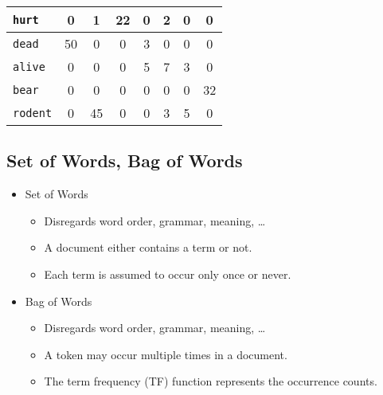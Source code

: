 \begin{table}[H]
\begin{tabular}{|l|c|c|c|c|c|c|c|}
                        \texttt{hurt}   & \textcolor{irl}{0} &         1          &         22         & \textcolor{irl}{0} &         2          & \textcolor{irl}{0} & \textcolor{irl}{0} \\ \hline
                        \texttt{dead}   &         50         & \textcolor{irl}{0} & \textcolor{irl}{0} &         3          & \textcolor{irl}{0} & \textcolor{irl}{0} & \textcolor{irl}{0} \\ \hline
                        \texttt{alive}  & \textcolor{irl}{0} & \textcolor{irl}{0} & \textcolor{irl}{0} &         5          &         7          &         3          & \textcolor{irl}{0} \\ \hline
                        \texttt{bear}   & \textcolor{irl}{0} & \textcolor{irl}{0} & \textcolor{irl}{0} & \textcolor{irl}{0} & \textcolor{irl}{0} & \textcolor{irl}{0} &         32         \\ \hline
                        \texttt{rodent} & \textcolor{irl}{0} &         45         & \textcolor{irl}{0} & \textcolor{irl}{0} &         3          &         5          & \textcolor{irl}{0} \\ \hline
                    \end{tabular}
                \end{table}

        \subsection{Set of Words, Bag of Words} %
            \begin{itemize}
            	\item Set of Words
            		\begin{itemize}
            			\item Disregards word order, grammar, meaning, \dots
            			\item A document either contains a term or not.
            			\item Each term is assumed to occur only once or never.
            		\end{itemize}
            	\item Bag of Words
            		\begin{itemize}
            			\item Disregards word order, grammar, meaning, \dots
            			\item A token may occur multiple times in a document.
            			\item The term frequency (TF) function represents the occurrence counts.
            		\end{itemize}
            \end{itemize}

